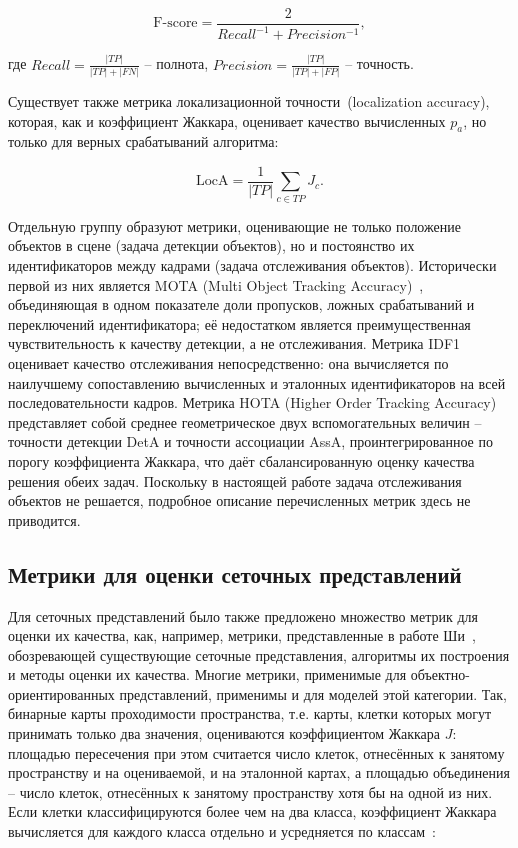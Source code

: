 \begin{equation}
	\text{F-score} = \dfrac{2}{Recall^{-1} + Precision^{-1}},
	\label{eq:fscore}
\end{equation}

где $Recall = \frac{|TP|}{|TP| + |FN|}$ -- полнота,  $Precision = \frac{|TP|}{|TP| + |FP|}$ -- точность.

Существует также метрика локализационной точности~(localization accuracy), которая, как и коэффициент Жаккара, оценивает качество вычисленных $p_a$, но только для верных срабатываний алгоритма:

\begin{equation}
	\text{LocA} = \dfrac{1}{|TP|}\sum_{c \in TP}J_c.
	\label{eq:loca}
\end{equation}

Отдельную группу образуют метрики, оценивающие не только положение объектов в сцене (задача детекции объектов), но и постоянство их идентификаторов между кадрами (задача отслеживания объектов). Исторически первой из них является MOTA (Multi Object Tracking Accuracy)~\cite{bernardin2008evaluating}, объединяющая в одном показателе доли пропусков, ложных срабатываний и переключений идентификатора; её недостатком является преимущественная чувствительность к качеству детекции, а не отслеживания. Метрика IDF1~\cite{ristani2016performance} оценивает качество отслеживания непосредственно: она вычисляется по наилучшему сопоставлению вычисленных и эталонных идентификаторов на всей последовательности кадров. Метрика HOTA (Higher Order Tracking Accuracy)~\cite{luiten2021hota} представляет собой среднее геометрическое двух вспомогательных величин -- точности детекции DetA и точности ассоциации AssA, проинтегрированное по порогу коэффициента Жаккара, что даёт сбалансированную оценку качества решения обеих задач. Поскольку в настоящей работе задача отслеживания объектов не решается, подробное описание перечисленных метрик здесь не приводится.

\subsection{Метрики для оценки сеточных представлений}

Для сеточных представлений было также предложено множество метрик для оценки их качества, как, например, метрики, представленные в работе Ши~\cite{10817778}, обозревающей существующие сеточные представления, алгоритмы их построения и методы оценки их качества. Многие метрики, применимые для объектно-ориентированных представлений, применимы и для моделей этой категории. Так, бинарные карты проходимости пространства, т.е. карты, клетки которых могут принимать только два значения, оцениваются коэффициентом Жаккара $J$: площадью пересечения при этом считается число клеток, отнесённых к занятому пространству и на оцениваемой, и на эталонной картах, а площадью объединения -- число клеток, отнесённых к занятому пространству хотя бы на одной из них. Если клетки классифицируются более чем на два класса, коэффициент Жаккара вычисляется для каждого класса отдельно и усредняется по классам~\cite{wang2025}:

